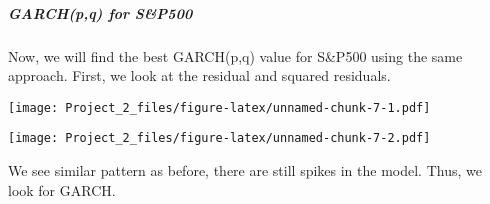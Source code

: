 \documentclass[]{article}
\newenvironment{Shaded}{\begin{snugshade}}{\end{snugshade}}
\newcommand{\KeywordTok}[1]{\textcolor[rgb]{0.13,0.29,0.53}{\textbf{#1}}}
\newcommand{\OperatorTok}[1]{\textcolor[rgb]{0.81,0.36,0.00}{\textbf{#1}}}
\newcommand{\NormalTok}[1]{#1}
\let\oldsubparagraph\subparagraph
\renewcommand{\subparagraph}[1]{\oldsubparagraph{#1}\mbox{}}
\begin{document}
\subparagraph{GARCH(p,q) for S\&P500}\label{garchpq-for-sp500}

Now, we will find the best GARCH(p,q) value for S\&P500 using the same
approach. First, we look at the residual and squared residuals.

\begin{Shaded}
\end{Shaded}

\texttt{[image: Project\_2\_files/figure-latex/unnamed-chunk-7-1.pdf]}

\begin{Shaded}
\end{Shaded}

\texttt{[image: Project\_2\_files/figure-latex/unnamed-chunk-7-2.pdf]}

We see similar pattern as before, there are still spikes in the model.
Thus, we look for GARCH.
\end{document}

